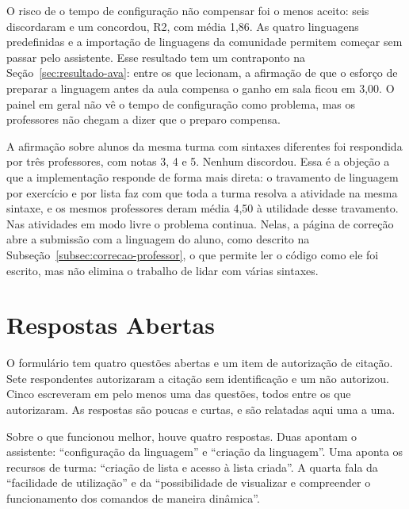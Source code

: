 O risco de o tempo de configuração não compensar foi o menos aceito: seis discordaram e um concordou, R2, com média 1,86. As quatro linguagens predefinidas e a importação de linguagens da comunidade permitem começar sem passar pelo assistente. Esse resultado tem um contraponto na Seção~\ref{sec:resultado-ava}: entre os que lecionam, a afirmação de que o esforço de preparar a linguagem antes da aula compensa o ganho em sala ficou em 3,00. O painel em geral não vê o tempo de configuração como problema, mas os professores não chegam a dizer que o preparo compensa.

A afirmação sobre alunos da mesma turma com sintaxes diferentes foi respondida por três professores, com notas 3, 4 e 5. Nenhum discordou. Essa é a objeção a que a implementação responde de forma mais direta: o travamento de linguagem por exercício e por lista faz com que toda a turma resolva a atividade na mesma sintaxe, e os mesmos professores deram média 4,50 à utilidade desse travamento. Nas atividades em modo livre o problema continua. Nelas, a página de correção abre a submissão com a linguagem do aluno, como descrito na Subseção~\ref{subsec:correcao-professor}, o que permite ler o código como ele foi escrito, mas não elimina o trabalho de lidar com várias sintaxes.

\section{Respostas Abertas}
\label{sec:resultado-abertas}

O formulário tem quatro questões abertas e um item de autorização de citação. Sete respondentes autorizaram a citação sem identificação e um não autorizou. Cinco escreveram em pelo menos uma das questões, todos entre os que autorizaram. As respostas são poucas e curtas, e são relatadas aqui uma a uma.

Sobre o que funcionou melhor, houve quatro respostas. Duas apontam o assistente: ``configuração da linguagem'' e ``criação da linguagem''. Uma aponta os recursos de turma: ``criação de lista e acesso à lista criada''. A quarta fala da ``facilidade de utilização'' e da ``possibilidade de visualizar e compreender o funcionamento dos comandos de maneira dinâmica''.

